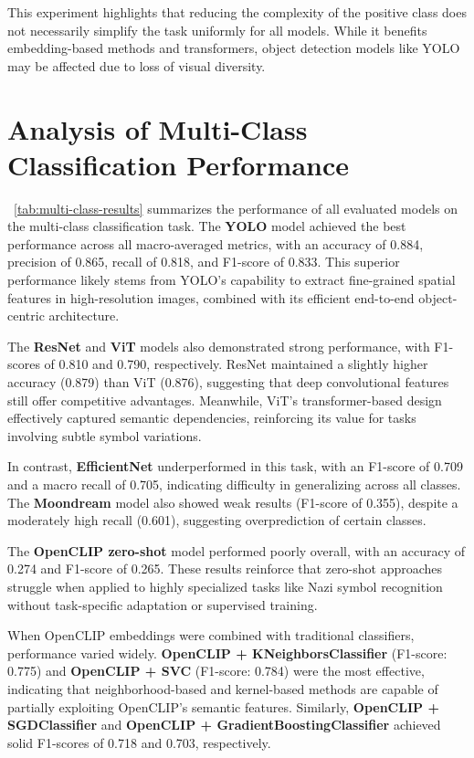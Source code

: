 This experiment highlights that reducing the complexity of the positive class does not necessarily simplify the task
uniformly for all models. While it benefits embedding-based methods and transformers, object detection models like
\ac{YOLO} may be affected due to loss of visual diversity.

\section{Analysis of Multi-Class Classification Performance}

~\autoref{tab:multi-class-results} summarizes the performance of all evaluated models on the multi-class
classification task. The \textbf{\ac{YOLO}} model achieved the best performance across all macro-averaged metrics,
with an accuracy of 0.884, precision of 0.865, recall of 0.818, and F1-score of 0.833. This superior performance
likely stems from \ac{YOLO}’s capability to extract fine-grained spatial features in high-resolution images, combined
with its efficient end-to-end object-centric architecture.

The \textbf{\ac{ResNet}} and \textbf{\ac{ViT}} models also demonstrated strong performance, with F1-scores of 0.810 and
0.790, respectively. \ac{ResNet} maintained a slightly higher accuracy (0.879) than \ac{ViT} (0.876), suggesting
that deep convolutional features still offer competitive advantages. Meanwhile, \ac{ViT}’s transformer-based design
effectively captured semantic dependencies, reinforcing its value for tasks involving subtle symbol variations.

In contrast, \textbf{EfficientNet} underperformed in this task, with an F1-score of 0.709 and a macro recall of
0.705, indicating difficulty in generalizing across all classes. The \textbf{Moondream} model also showed weak
results (F1-score of 0.355), despite a moderately high recall (0.601), suggesting overprediction of certain classes.

The \textbf{OpenCLIP zero-shot} model performed poorly overall, with an accuracy of 0.274 and F1-score of 0.265.
These results reinforce that zero-shot approaches struggle when applied to highly specialized tasks like Nazi symbol
recognition without task-specific adaptation or supervised training.

When OpenCLIP embeddings were combined with traditional classifiers, performance varied widely.
\textbf{OpenCLIP + KNeighborsClassifier} (F1-score: 0.775) and \textbf{OpenCLIP + \ac{SVC}} (F1-score: 0.784) were
the most effective, indicating that neighborhood-based and kernel-based methods are capable of partially exploiting
OpenCLIP’s semantic features. Similarly, \textbf{OpenCLIP + SGDClassifier} and
\textbf{OpenCLIP + GradientBoostingClassifier} achieved solid F1-scores of 0.718 and 0.703, respectively.

